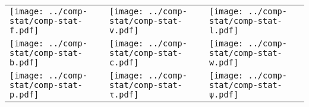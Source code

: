 \documentclass{standalone}
\begin{document}
\begin{tabular}{lll}
\texttt{[image: ../comp-stat/comp-stat-f.pdf]}&
\texttt{[image: ../comp-stat/comp-stat-v.pdf]}&
\texttt{[image: ../comp-stat/comp-stat-l.pdf]}\\
\texttt{[image: ../comp-stat/comp-stat-b.pdf]}&
\texttt{[image: ../comp-stat/comp-stat-c.pdf]}&
\texttt{[image: ../comp-stat/comp-stat-w.pdf]}\\
\texttt{[image: ../comp-stat/comp-stat-p.pdf]}&
\texttt{[image: ../comp-stat/comp-stat-τ.pdf]}&
\texttt{[image: ../comp-stat/comp-stat-ψ.pdf]}
\end{tabular}
\end{document}
